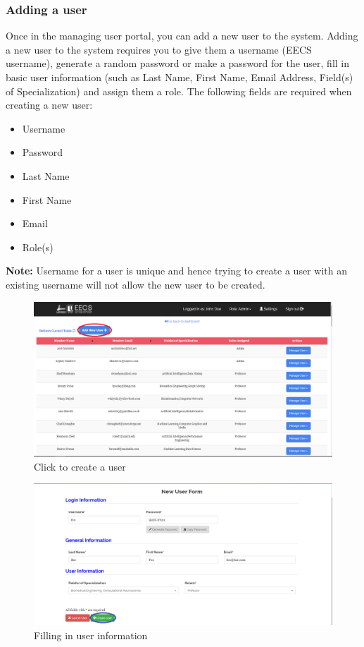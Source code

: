 \documentclass[fontsize=12pt,paper=letter,twoside]{scrartcl}
\begin{document}
\subsubsection{Adding a user}
Once in the managing user portal, you can add a new user to the system. Adding a new user to the system requires you to give them a username (EECS username), generate a random password or make a password for the user, fill in basic user information (such as Last Name, First Name, Email Address, Field(s) of Specialization) and assign them a role. The following fields are required when creating a new user:
\begin{itemize}
\item Username
\item Password
\item Last Name
\item First Name
\item Email
\item Role(s)
\end{itemize}

\smallskip
\noindent \textbf{Note:} Username for a user is unique and hence trying to create a user with an existing username will not allow the new user to be created.

\begin{figure}[!htb]
\begin{center}
\includegraphics[width=.99\textwidth]{images/adm/mu/new_user_click.png}
\end{center}
\caption{Click to create a user}
\label{fig:adm/new_user_click}
\end{figure}

\begin{figure}[!htb]
\begin{center}
\includegraphics[width=.99\textwidth]{images/adm/mu/fill_in_user.png}
\end{center}
\caption{Filling in user information}
\label{fig:adm/fill_in_user}
\end{figure}
\end{document}
